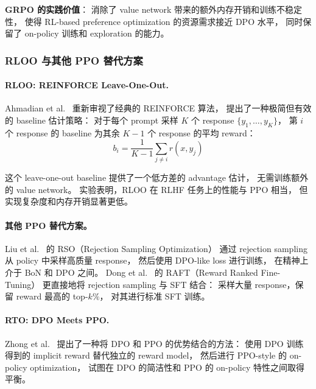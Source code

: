 \begin{solutionbox}
\textbf{GRPO 的实践价值}：
消除了 value network 带来的额外内存开销和训练不稳定性，
使得 RL-based preference optimization 的资源需求接近 DPO 水平，
同时保留了 on-policy 训练和 exploration 的能力。
\end{solutionbox}

\subsubsection{RLOO 与其他 PPO 替代方案}
\label{sec:t2-rloo}

\paragraph{RLOO: REINFORCE Leave-One-Out.}
Ahmadian et al.\ \cite{ahmadian2024rloo} 重新审视了经典的 REINFORCE 算法，
提出了一种极简但有效的 baseline 估计策略：
对于每个 prompt 采样 $K$ 个 response $\{y_1, \ldots, y_K\}$，
第 $i$ 个 response 的 baseline 为其余 $K-1$ 个 response 的平均 reward：
\begin{equation}
\label{eq:pref:rloo}
b_i = \frac{1}{K-1} \sum_{j \neq i} r(x, y_j)
\end{equation}

这个 leave-one-out baseline 提供了一个低方差的 advantage 估计，
无需训练额外的 value network。
实验表明，RLOO 在 RLHF 任务上的性能与 PPO 相当，
但实现复杂度和内存开销显著更低。

\paragraph{其他 PPO 替代方案。}
Liu et al.\ \cite{liu2023rso} 的 RSO（Rejection Sampling Optimization）
通过 rejection sampling 从 policy 中采样高质量 response，
然后使用 DPO-like loss 进行训练，
在精神上介于 BoN 和 DPO 之间。
Dong et al.\ \cite{dong2023raft} 的 RAFT（Reward Ranked Fine-Tuning）
更直接地将 rejection sampling 与 SFT 结合：
采样大量 response，保留 reward 最高的 top-$k\%$，
对其进行标准 SFT 训练。

\paragraph{RTO: DPO Meets PPO.}
Zhong et al.\ \cite{zhong2024rto} 提出了一种将 DPO 和 PPO 的优势结合的方法：
使用 DPO 训练得到的 implicit reward 替代独立的 reward model，
然后进行 PPO-style 的 on-policy optimization，
试图在 DPO 的简洁性和 PPO 的 on-policy 特性之间取得平衡。

